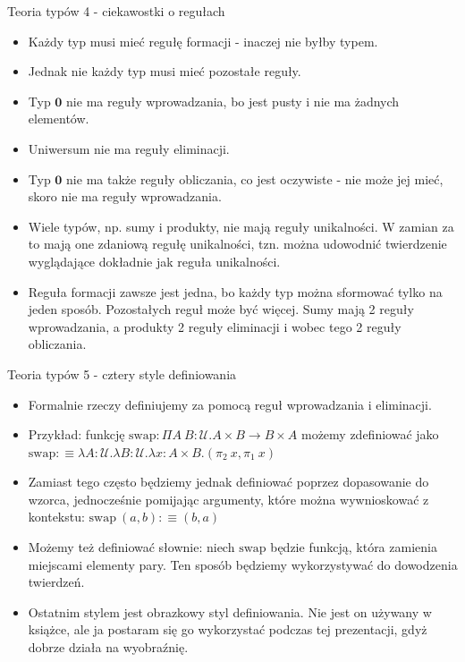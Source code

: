\documentclass{beamer}
\newcommand{\U}{\mathcal{U}}
\begin{document}
\begin{frame}{Teoria typów 4 - ciekawostki o regułach}
\begin{itemize}
	\item Każdy typ musi mieć regułę formacji - inaczej nie byłby typem.
	\item Jednak nie każdy typ musi mieć pozostałe reguły.
	\item Typ $\mathbf{0}$ nie ma reguły wprowadzania, bo jest pusty i nie ma żadnych elementów.
	\item Uniwersum nie ma reguły eliminacji.
	\item Typ $\mathbf{0}$ nie ma także reguły obliczania, co jest oczywiste - nie może jej mieć, skoro nie ma reguły wprowadzania.
	\item Wiele typów, np. sumy i produkty, nie mają reguły unikalności. W zamian za to mają one zdaniową regułę unikalności, tzn. można udowodnić twierdzenie wyglądające dokładnie jak reguła unikalności.
	\item Reguła formacji zawsze jest jedna, bo każdy typ można sformować tylko na jeden sposób. Pozostałych reguł może być więcej. Sumy mają 2 reguły wprowadzania, a produkty 2 reguły eliminacji i wobec tego 2 reguły obliczania.
\end{itemize}
\end{frame}

\begin{frame}{Teoria typów 5 - cztery style definiowania}
\begin{itemize}
	\item Formalnie rzeczy definiujemy za pomocą reguł wprowadzania i eliminacji.
	\item Przykład: funkcję $\text{swap} : \Pi A\ B : \U. A \times B \to B \times A$ możemy zdefiniować jako $\text{swap} :\equiv \lambda A : \U.\lambda B : \U.\lambda x : A \times B. (\pi_2\ x, \pi_1\ x)$
	\item Zamiast tego często będziemy jednak definiować poprzez dopasowanie do wzorca, jednocześnie pomijając argumenty, które można wywnioskować z kontekstu: $\text{swap}\ (a, b) :\equiv (b, a)$
	\item Możemy też definiować słownie: niech $\text{swap}$ będzie funkcją, która zamienia miejscami elementy pary. Ten sposób będziemy wykorzystywać do dowodzenia twierdzeń.
	\item Ostatnim stylem jest obrazkowy styl definiowania. Nie jest on używany w książce, ale ja postaram się go wykorzystać podczas tej prezentacji, gdyż dobrze działa na wyobraźnię.
\end{itemize}
\end{frame}
\end{document}
